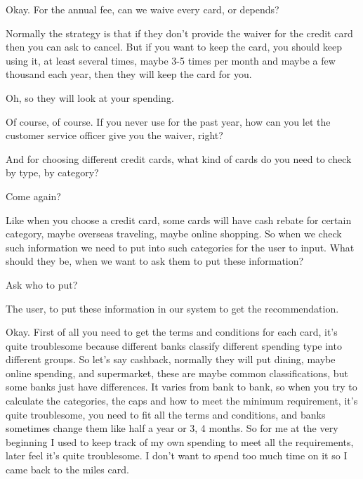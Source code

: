 \begin{description}[leftmargin=4em,style=nextline]
	\item[LD:] Okay. For the annual fee, can we waive every card, or depends?

	\item[HJ:] Normally the strategy is that if they don't provide the waiver for the credit card then you can ask to cancel. But if you want to keep the card, you should keep using it, at least several times, maybe 3-5 times per month and maybe a few thousand each year, then they will keep the card for you.

	\item[LD:] Oh, so they will look at your spending.

	\item[HJ:] Of course, of course. If you never use for the past year, how can you let the customer service officer give you the waiver, right?

	\item[JH:] And for choosing different credit cards, what kind of cards do you need to check by type, by category?

	\item[HJ:] Come again?

	\item[JH:] Like when you choose a credit card, some cards will have cash rebate for certain category, maybe overseas traveling, maybe online shopping. So when we check such information we need to put into such categories for the user to input. What should they be, when we want to ask them to put these information?

	\item[HJ:] Ask who to put?

	\item[JH:] The user, to put these information in our system to get the recommendation.

	\item[HJ:] Okay. First of all you need to get the terms and conditions for each card, it's quite troublesome because different banks classify different spending type into different groups. So let's say cashback, normally they will put dining, maybe online spending, and supermarket, these are maybe common classifications, but some banks just have differences. It varies from bank to bank, so when you try to calculate the categories, the caps and how to meet the minimum requirement, it's quite troublesome, you need to fit all the terms and conditions, and banks sometimes change them like half a year or 3, 4 months. So for me at the very beginning I used to keep track of my own spending to meet all the requirements, later feel it’s quite troublesome. I don’t want to spend too much time on it so I came back to the miles card.


\end{description}
